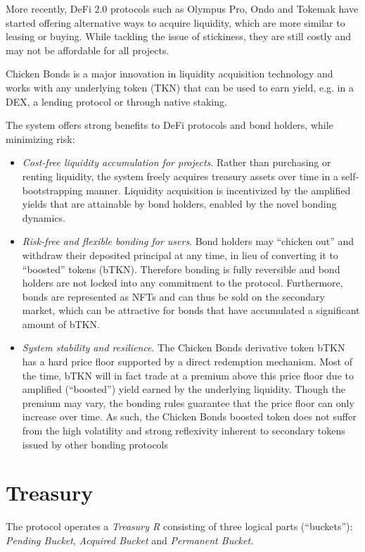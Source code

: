 \documentclass{article}
\begin{document}
More recently, DeFi 2.0 protocols such as Olympus Pro, Ondo and Tokemak have started offering alternative ways to acquire liquidity, which are more similar to leasing or buying. While tackling the issue of stickiness, they are still costly and may not be affordable for all projects.

Chicken Bonds is a major innovation in liquidity acquisition technology and works with any underlying token (TKN) that can be used to earn yield, e.g. in a DEX, a lending protocol or through native staking.

The system offers strong benefits to DeFi protocols and bond holders, while minimizing risk:

\begin{itemize}
    \item \textit{Cost-free liquidity accumulation for projects}. Rather than purchasing or renting liquidity, the system freely acquires treasury assets over time in a self-bootstrapping manner. Liquidity acquisition is incentivized by the amplified yields that are attainable by bond holders, enabled by the novel bonding dynamics.
    \item \textit{Risk-free and flexible bonding for users}. Bond holders may “chicken out” and withdraw their deposited principal at any time, in lieu of converting it to “boosted” tokens (bTKN). Therefore bonding is fully reversible and bond holders are not locked into any commitment to the protocol. Furthermore, bonds are represented as NFTs and can thus be sold on the secondary market, which can be attractive for bonds that have accumulated a significant amount of bTKN.
    \item \textit{System stability and resilience}. The Chicken Bonds derivative token bTKN has a hard price floor supported by a direct redemption mechanism. Most of the time, bTKN will in fact trade at a premium above this price floor due to amplified (“boosted”) yield earned by the underlying liquidity. Though the premium may vary, the bonding rules guarantee that the price floor can only increase over time. As such, the Chicken Bonds boosted token does not suffer from the high volatility and strong reflexivity inherent to secondary tokens issued by other bonding protocols
\end{itemize}

\section{Treasury}
The protocol operates a \textit{Treasury R} consisting of three logical parts (“buckets”):  \textit{Pending Bucket}, \textit{Acquired Bucket} and \textit{Permanent Bucket}.
\end{document}

